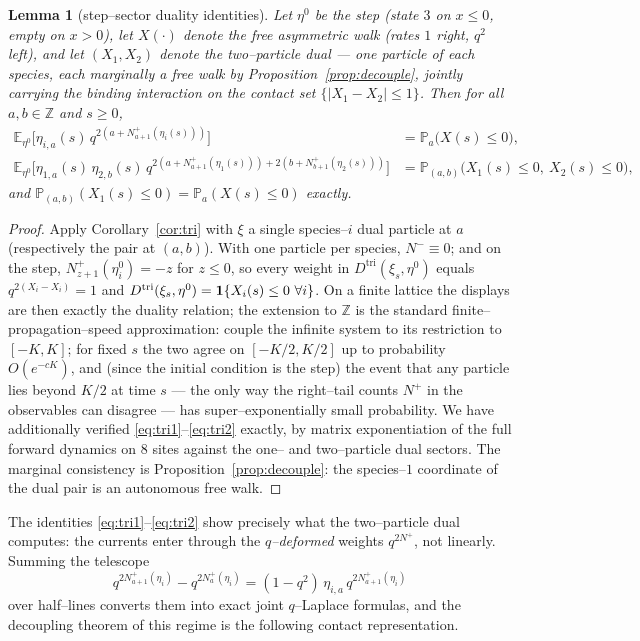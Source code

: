 \documentclass[11pt]{article}
\theoremstyle{plain}
\newtheorem{lemma}[theorem]{Lemma}
\theoremstyle{definition}
\theoremstyle{remark}
\newcommand{\Z}{\mathbb{Z}}\newcommand{\R}{\mathbb{R}}\newcommand{\N}{\mathbb{N}}
\newcommand{\E}{\mathbb{E}}\newcommand{\PP}{\mathbb{P}}\newcommand{\dd}{\,\mathrm{d}}
\begin{document}
\begin{lemma}[step--sector duality identities]\label{lem:tridual}
Let $\eta^0$ be the step (state $3$ on $x\le0$, empty on $x>0$), let $X(\cdot)$ denote
the free asymmetric walk (rates $1$ right, $q^2$ left), and let $(X_1,X_2)$ denote the
two--particle dual --- one particle of each species, each marginally a free walk by
Proposition~\ref{prop:decouple}, jointly carrying the binding interaction on the
contact set $\{|X_1-X_2|\le1\}$. Then for all $a,b\in\Z$ and $s\ge0$,
\begin{align}
  \E_{\eta^0}\Big[\eta_{i,a}(s)\,q^{2\left(a+N^+_{a+1}(\eta_i(s))\right)}\Big]
   &=\PP_a\big(X(s)\le0\big),\label{eq:tri1}\\
  \E_{\eta^0}\Big[\eta_{1,a}(s)\,\eta_{2,b}(s)\,
    q^{2\left(a+N^+_{a+1}(\eta_1(s))\right)+2\left(b+N^+_{b+1}(\eta_2(s))\right)}\Big]
   &=\PP_{(a,b)}\big(X_1(s)\le0,\ X_2(s)\le0\big),\label{eq:tri2}
\end{align}
and $\PP_{(a,b)}(X_1(s)\le0)=\PP_a(X(s)\le0)$ exactly.
\end{lemma}
\begin{proof}
Apply Corollary~\ref{cor:tri} with $\xi$ a single species--$i$ dual particle at $a$
(respectively the pair at $(a,b)$). With one particle per species, $N^-\equiv0$; and
on the step, $N^+_{z+1}(\eta^0_i)=-z$ for $z\le0$, so every weight in
$D^{\mathrm{tri}}(\xi_s,\eta^0)$ equals $q^{2(X_i-X_i)}=1$ and
$D^{\mathrm{tri}}(\xi_s,\eta^0)=\bone\{X_i(s)\le0\ \forall i\}$. On a finite lattice
the displays are then exactly the duality relation; the extension to $\Z$ is the
standard finite--propagation--speed approximation: couple the infinite system to its
restriction to $[-K,K]$; for fixed $s$ the two agree on $[-K/2,K/2]$ up to
probability $O(e^{-cK})$, and (since the initial condition is the step) the event
that any particle lies beyond $K/2$ at time $s$ --- the only way the right--tail
counts $N^+$ in the observables can disagree --- has super--exponentially small
probability. We
have additionally verified \eqref{eq:tri1}--\eqref{eq:tri2} exactly, by matrix
exponentiation of the full forward dynamics on $8$ sites against the one-- and
two--particle dual sectors. The marginal consistency is
Proposition~\ref{prop:decouple}: the species--$1$ coordinate of the dual pair is an
autonomous free walk.
\end{proof}

The identities \eqref{eq:tri1}--\eqref{eq:tri2} show precisely what the two--particle
dual computes: the currents enter through the \emph{$q$--deformed} weights
$q^{2N^+}$, not linearly. Summing the telescope
\begin{equation}\label{eq:telescope}
  q^{2N^+_{a+1}(\eta_i)}-q^{2N^+_{a}(\eta_i)}
  =(1-q^2)\,\eta_{i,a}\,q^{2N^+_{a+1}(\eta_i)}
\end{equation}
over half--lines converts them into exact joint $q$--Laplace formulas, and the
decoupling theorem of this regime is the following contact representation.
\end{document}
